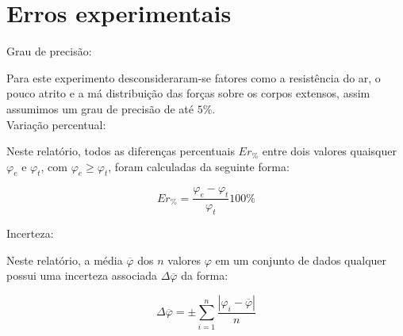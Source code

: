 \chapter{Erros experimentais}

  \noindent Grau de precisão:

  Para este experimento desconsideraram-se fatores como a resistência do ar, o pouco atrito e a má distribuição das forças 
  sobre os corpos extensos, assim assumimos um grau de precisão de até $5\%$. \\

  \noindent Variação percentual:

  Neste relatório, todos as diferenças percentuais $Er_\%$ entre dois valores quaisquer $\varphi_e$ e $\varphi_t$, com 
  $\varphi_e\geq\varphi_t$, foram 
  calculadas da seguinte forma:

  \begin{equation} \label{eq:errper}
     Er_\% = \frac{\varphi_e - \varphi_t}{\varphi_t}100\%
  \end{equation}

  \noindent Incerteza:

  Neste relatório, a média $\overline{\varphi}$ dos $n$ valores $\varphi$ em um conjunto de dados qualquer possui uma 
  incerteza associada $\Delta \overline{\varphi}$ da forma:

  \begin{equation}\label{eq:incet}
     \Delta \overline{\varphi} = ± \sum_{i=1}^{n} \frac{| \varphi_i - \overline{\varphi}|}{n}
  \end{equation}